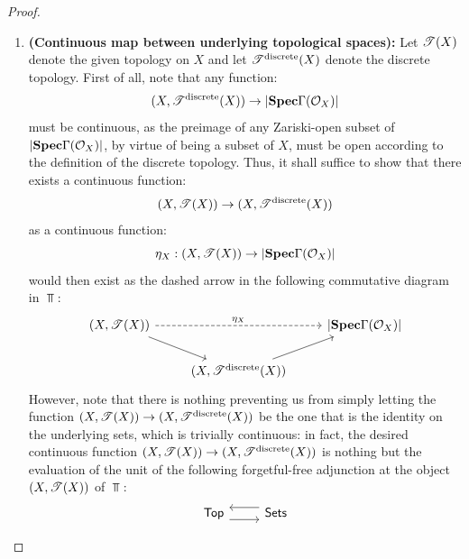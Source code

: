                     \begin{proof}
                        \noindent
                        \begin{enumerate}
                            \item \textbf{(Continuous map between underlying topological spaces):} Let $\T(X)$ denote the given topology on $X$ and let $\T^{\discrete}(X)$ denote the discrete topology. First of all, note that any function:
                                $$(X, \T^{\discrete}(X)) \to |\Spec \Gamma(\calO_X)|$$
                            must be continuous, as the preimage of any Zariski-open subset of $|\Spec \Gamma(\calO_X)|$, by virtue of being a subset of $X$, must be open according to the definition of the discrete topology. Thus, it shall suffice to show that there exists a continuous function:
                                $$(X, \T(X)) \to (X, \T^{\discrete}(X))$$
                            as a continuous function:
                                $$\eta_X: (X, \T(X)) \to |\Spec \Gamma(\calO_X)|$$
                            would then exist as the dashed arrow in the following commutative diagram in $\Top$:
                                $$
                                    \begin{tikzcd}
                                    	{(X, \T(X))} && {|\Spec \Gamma(\calO_X)|} \\
                                    	& {(X, \T^{\discrete}(X))}
                                    	\arrow[from=1-1, to=2-2]
                                    	\arrow[from=2-2, to=1-3]
                                    	\arrow["\eta_X", dashed, from=1-1, to=1-3]
                                    \end{tikzcd}
                                $$
                            However, note that there is nothing preventing us from simply letting the function $(X, \T(X)) \to (X, \T^{\discrete}(X))$ be the one that is the identity on the underlying sets, which is trivially continuous: in fact, the desired continuous function $(X, \T(X)) \to (X, \T^{\discrete}(X))$ is nothing but the evaluation of the unit of the following forgetful-free adjunction at the object $(X, \T(X))$ of $\Top$:
                                $$
                                    \begin{tikzcd}
                                    	\Top & \Sets
                                    	\arrow[""{name=0, anchor=center, inner sep=0}, shift right=2, from=1-1, to=1-2]
                                    	\arrow[""{name=1, anchor=center, inner sep=0}, shift right=2, from=1-2, to=1-1]

\end{tikzcd}$$
\end{enumerate}
\end{proof}
